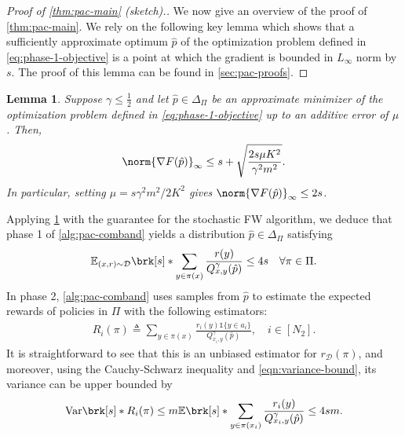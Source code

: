 \documentclass[11pt]{article}
\newcommand{\eqdef}{\triangleq}
\renewcommand{\ind}[1]{\mathds{1}\{#1\}}
\newcommand{\bbE}{\boldsymbol{\mathbb{E}}}
\renewcommand{\E}{\bbE}
\newcommand{\yprobg}[3]{Q^\gamma_{#2,#3}(#1)}
\newcommand{\pred}{a}
\newcommand{\rew}{r}
\newcommand{\lab}{y}
\newcommand{\calD}{\mathcal{D}}
\newcommand{\obj}{F}
\theoremstyle{plain}
\newtheorem{lemma}{Lemma}
\begin{document}


\begin{proof}[Proof of \cref{thm:pac-main} (sketch).]
We now give an overview of the proof of \cref{thm:pac-main}. We rely on the following key lemma which shows that a sufficiently approximate optimum $\hat p$ of the optimization problem defined in \cref{eq:phase-1-objective} is a point at which the gradient is bounded in $L_\infty$ norm by $s$. The proof of this lemma can be found in \cref{sec:pac-proofs}.
\end{proof}


\begin{lemma}
\label{lem:log-self-concordance}
Suppose $\gamma \leq \frac12$ and let $\hat p \in \Delta_{\Pi}$ be an approximate minimizer of the optimization problem defined in \cref{eq:phase-1-objective} up to an additive error of $\mu$.
Then,
% 
\begin{align*}
    \norm{\nabla \obj(\hat p)}_\infty \leq s + \sqrt{\frac{2 s \mu K^2}{\gamma^2 m^2}}.
\end{align*}
In particular, setting $\mu = s \gamma^2 m^2 / 2 K^2$ gives $\norm{\nabla \obj(\hat p)}_\infty \leq 2s$.
\end{lemma}
% 
Applying \cref{lem:log-self-concordance} with the guarantee for the stochastic FW algorithm, we deduce that phase 1 of \cref{alg:pac-comband} yields a distribution $\hat p \in \Delta_\Pi$ satisfying
\begin{align}
\label{eqn:variance-bound}
    \E_{(x,\rew) \sim \calD} \brk[s]*{\sum_{\lab \in \pi(x)} \frac{\rew(\lab) }{\yprobg{\hat p}{x}{\lab}}} \leq 4s \quad \forall \pi \in \Pi.
\end{align}
In phase 2, \cref{alg:pac-comband} uses samples from $\hat p$ to estimate the expected rewards of policies in $\Pi$ with the following estimators: 
\begin{align*}
    R_i(\pi) \eqdef \sum_{\lab \in \pi(x)} \frac{\rew_i(\lab) \ind{\lab \in \pred_i}}{\yprobg{\hat p}{x_i}{\lab}}, \quad i \in [N_2].
\end{align*}
It is straightforward to see that this is an unbiased estimator for $\rew_\calD(\pi)$, and moreover, using the Cauchy-Schwarz inequality and \cref{eqn:variance-bound}, its variance can be upper bounded by
\begin{align*}
    \mathrm{Var} \brk[s]*{R_i(\pi)} \leq m \E \brk[s]*{\sum_{\lab \in \pi(x_i)} \frac{\rew_i(\lab)}{\yprobg{\hat p}{x_i}{\lab}}} \leq 4sm.
\end{align*}
\end{document}
